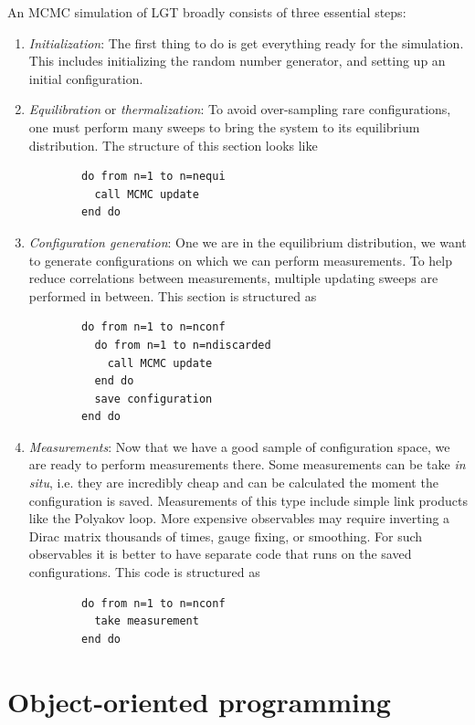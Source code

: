 An MCMC simulation of LGT broadly consists of three essential steps:
\begin{enumerate}
  \item {\it Initialization}: The first thing to do is get everything ready for
        the simulation. This includes initializing the random number generator,
        and setting up an initial configuration.
  \item {\it Equilibration} or {\it thermalization}:
        To avoid over-sampling rare configurations,
        one must perform many sweeps to bring the system to its equilibrium 
        distribution. The structure of this section looks like 
        \begin{verbatim}
        do from n=1 to n=nequi 
          call MCMC update
        end do
        \end{verbatim}
  \item {\it Configuration generation}: One we are in the equilibrium
        distribution, we want to generate configurations on which we can
        perform measurements. To help reduce correlations between
        measurements, multiple updating sweeps are performed in between.
        This section is structured as
        \begin{verbatim}
        do from n=1 to n=nconf
          do from n=1 to n=ndiscarded
            call MCMC update
          end do
          save configuration 
        end do
        \end{verbatim}
  \item {\it Measurements}: Now that we have a good sample of configuration
        space, we are ready to perform measurements there. Some measurements
        can be take {\it in situ}, i.e. they are incredibly cheap and can be
        calculated the moment the configuration is saved. Measurements of this
        type include simple link products like the Polyakov loop. More expensive
        observables may require inverting a Dirac matrix thousands of times, 
        gauge fixing, or smoothing. For such observables it is better to
        have separate code that runs on the saved configurations. This
        code is structured as
        \begin{verbatim}
        do from n=1 to n=nconf
          take measurement 
        end do
        \end{verbatim}
\end{enumerate}

\section{Object-oriented programming}\label{sec:oop}


